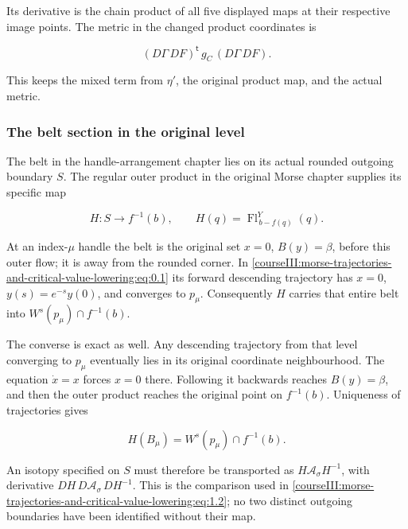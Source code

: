 Its derivative is the chain product of all five displayed maps at their respective image points. The metric in the changed product coordinates is

\begin{equation}
(D\Gamma\,DF)^{\mathsf t}\,g_C\,(D\Gamma\,DF).
 \label{courseIII:morse-trajectories-and-critical-value-lowering:eq:1.10}
\end{equation}

This keeps the mixed term from \(\eta'\), the original product map, and the actual metric.

\subsubsection{The belt section in the original level}
\label{courseIII:morse-trajectories-and-critical-value-lowering:section-1.1}

The belt in the handle-arrangement chapter lies on its actual rounded outgoing boundary \(S\). The regular outer product in the original Morse chapter supplies its specific map

\begin{equation}
H:S\longrightarrow f^{-1}(b),\qquad
 H(q)=\operatorname{Fl}^{Y}_{\,b-f(q)}(q).
 \label{courseIII:morse-trajectories-and-critical-value-lowering:eq:1.11}
\end{equation}

At an index-\(\mu\) handle the belt is the original set \(x=0\), \(B(y)=\beta\), before this outer flow; it is away from the rounded corner. In \eqref{courseIII:morse-trajectories-and-critical-value-lowering:eq:0.1} its forward descending trajectory has \(x=0\), \(y(s)=e^{-s}y(0)\), and converges to \(p_\mu\). Consequently \(H\) carries that entire belt into
\(W^s(p_\mu)\cap f^{-1}(b)\).

The converse is exact as well. Any descending trajectory from that level converging to \(p_\mu\) eventually lies in its original coordinate neighbourhood. The equation \(\dot x=x\) forces \(x=0\) there. Following it backwards reaches \(B(y)=\beta\), and then the outer product reaches the original point on \(f^{-1}(b)\). Uniqueness of trajectories gives

\begin{equation}
H(B_\mu)=W^s(p_\mu)\cap f^{-1}(b).
 \label{courseIII:morse-trajectories-and-critical-value-lowering:eq:1.12}
\end{equation}

An isotopy specified on \(S\) must therefore be transported as
\(H\mathcal A_\sigma H^{-1}\), with derivative
\(DH\,D\mathcal A_\sigma\,DH^{-1}\). This is the comparison used in \eqref{courseIII:morse-trajectories-and-critical-value-lowering:eq:1.2}; no two distinct outgoing boundaries have been identified without their map.

